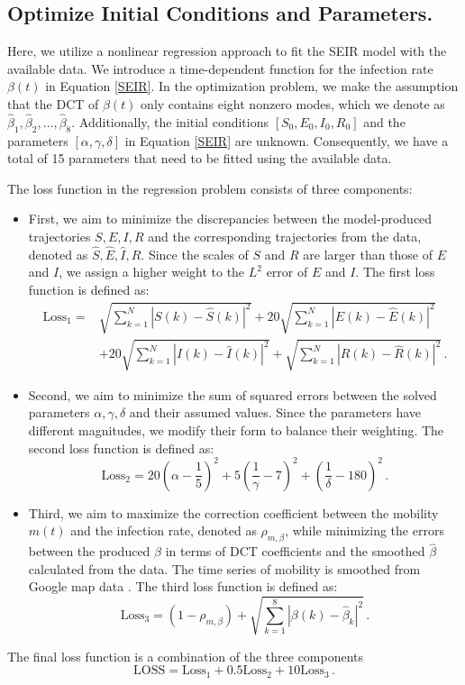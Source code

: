 \documentclass[sn-mathphys,Numbered]{sn-jnl}
\begin{document}
\subsection{Optimize Initial Conditions and Parameters.}
Here, we utilize a nonlinear regression approach to fit the SEIR model with the available data. We introduce a time-dependent function for the infection rate $\beta(t)$ in Equation \eqref{SEIR}. In the optimization problem, we make the assumption that the DCT of $\beta(t)$ only contains eight nonzero modes, which we denote as $\hat{\beta}_1, \hat{\beta}_2, ..., \hat{\beta}_8$. Additionally, the initial conditions $[S_0, E_0, I_0, R_0]$ and the parameters $[\alpha, \gamma, \delta]$ in Equation \eqref{SEIR} are unknown. Consequently, we have a total of 15 parameters that need to be fitted using the available data.

The loss function in the regression problem consists of three components:
\begin{itemize}
    \item[A ] First, we aim to minimize the discrepancies between the model-produced trajectories $S, E, I, R$ and the corresponding trajectories from the data, denoted as $\hat{S}, \hat{E}, \hat{I}, \hat{R}$. Since the scales of $S$ and $R$ are larger than those of $E$ and $I$, we assign a higher weight to the $L^2$ error of $E$ and $I$. The first loss function is defined as:
    $$
\begin{aligned}
    \mathrm{Loss}_1 = &\sqrt{\sum_{k=1}^{N}\left|S(k)-\hat{S}(k)\right|^2} + 20\sqrt{\sum_{k=1}^{N}\left|E(k)-\hat{E}(k)\right|^2}\\
    &+20\sqrt{\sum_{k=1}^{N}\left|I(k)-\hat{I}(k)\right|^2}+\sqrt{\sum_{k=1}^{N}\left|R(k)-\hat{R}(k)\right|^2}\,.
\end{aligned}
$$
    \item[B ] Second, we aim to minimize the sum of squared errors between the solved parameters $\alpha, \gamma, \delta$ and their assumed values. Since the parameters have different magnitudes, we modify their form to balance their weighting. The second loss function is defined as:
    $$
\mathrm{Loss}_2=20\left(\alpha-\frac{1}{5}\right)^2+5\left(\frac{1}{\gamma}-7\right)^2+\left(\frac{1}{\delta}-180\right)^2\,.
$$
    \item[C ]  Third, we aim to maximize the correction coefficient between the mobility $m(t)$ and the infection rate, denoted as $\rho_{m,\beta}$, while minimizing the errors between the produced $\beta$ in terms of DCT coefficients and the smoothed $\hat{\beta}$ calculated from the data. The time series of mobility is smoothed from Google map data \cite{mobility}. The third loss function is defined as:
    $$
\mathrm{Loss}_3=(1-\rho_{m,\beta})+\sqrt{\sum_{k=1}^{8}\left|\beta(k)-\hat{\beta}_k\right|^2}\,.
$$
\end{itemize}
The final loss function is a combination of the three components
\begin{equation*}
    \mathrm{LOSS} = \mathrm{Loss}_1+0.5\mathrm{Loss}_2+10\mathrm{Loss}_3\,.
\end{equation*}
\end{document}

